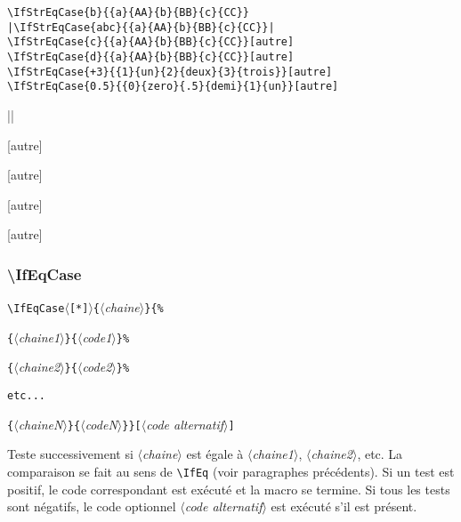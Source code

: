 \documentclass[a4paper,10pt]{article}
\newcommand\argu[1]{$\langle$\textit{#1}$\rangle$}
\newcommand\ARGU[1]{\texttt{\color{black}\{}\argu{#1}\texttt{\color{black}\}}}
\newcommand\arguC[1]{\texttt{\color{black}[}\argu{#1}\texttt{\color{black}]}}
\newcommand\etoile{$\langle$\texttt{[*]}$\rangle$}
\newcommand\styleexemple{\small\vskip4pt}
\newcommand\verbinline{\lstinline[basicstyle=\normalsize\ttfamily]}
\begin{document}
\begin{minipage}[t]{0.65\linewidth}
\begin{lstlisting}
\IfStrEqCase{b}{{a}{AA}{b}{BB}{c}{CC}}
|\IfStrEqCase{abc}{{a}{AA}{b}{BB}{c}{CC}}|
\IfStrEqCase{c}{{a}{AA}{b}{BB}{c}{CC}}[autre]
\IfStrEqCase{d}{{a}{AA}{b}{BB}{c}{CC}}[autre]
\IfStrEqCase{+3}{{1}{un}{2}{deux}{3}{trois}}[autre]
\IfStrEqCase{0.5}{{0}{zero}{.5}{demi}{1}{un}}[autre]
\end{lstlisting}%
\end{minipage}\hfill
\begin{minipage}[t]{0.35\linewidth}
	\styleexemple
	\par
	||\par
	[autre]\par
	[autre]\par
	[autre]\par
	[autre]
\end{minipage}%

\subsubsection{\ttfamily\textbackslash IfEqCase}
\begin{minipage}{\textwidth}
	\verbinline|\IfEqCase|\etoile\ARGU{chaine}\verb|{%|\par
	\qquad\qquad\ARGU{chaine1}\ARGU{code1}\verb|%|\par
	\qquad\qquad\ARGU{chaine2}\ARGU{code2}\verb|%|\par
	\qquad\qquad\verb|etc...|\par
	\qquad\qquad\ARGU{chaineN}\ARGU{codeN}\verb|}|\arguC{code alternatif}
\end{minipage}
\smallskip

Teste successivement si \argu{chaine} est égale à \argu{chaine1}, \argu{chaine2}, etc. La comparaison se fait au sens de \verbinline|\IfEq| (voir paragraphes précédents). Si un test est positif, le code correspondant est exécuté et la macro se termine. Si tous les tests sont négatifs, le code optionnel \argu{code alternatif} est exécuté s'il est présent.\smallskip
\end{document}
